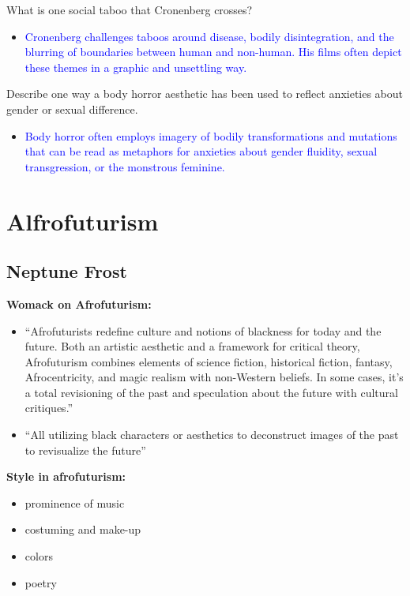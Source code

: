 \documentclass[11pt,fleqn]{book}
\begin{document}
\begin{exercise}
What is one social taboo that Cronenberg crosses?
\begin{itemize}
    \item \textcolor{blue}{Cronenberg challenges taboos around disease, bodily disintegration, and the blurring of boundaries between human and non-human. His films often depict these themes in a graphic and unsettling way.}
\end{itemize}
\end{exercise}

\begin{exercise}
Describe one way a body horror aesthetic has been used to reflect anxieties about gender or sexual difference.
\begin{itemize}
    \item \textcolor{blue}{Body horror often employs imagery of bodily transformations and mutations that can be read as metaphors for anxieties about gender fluidity, sexual transgression, or the monstrous feminine.}
\end{itemize}
\end{exercise}







\section{Alfrofuturism}
\subsection{Neptune Frost}
\textbf{Womack on Afrofuturism: }
\begin{itemize}
    \item \enquote{Afrofuturists redefine culture and
notions of blackness for today and the
future. Both an artistic aesthetic and a
framework for critical theory, Afrofuturism
combines elements of science fiction,
historical fiction, fantasy, Afrocentricity,
and magic realism with non-Western
beliefs. In some cases, it's a total
revisioning of the past and speculation
about the future with cultural critiques.}
    \item \enquote{All utilizing black
characters or aesthetics
to deconstruct images of
the past to revisualize
the future}
\end{itemize}

\textbf{Style in afrofuturism: }
\begin{itemize}
    \item prominence of music
    \item costuming and make-up
    \item colors
    \item poetry
\end{itemize}
\end{document}
